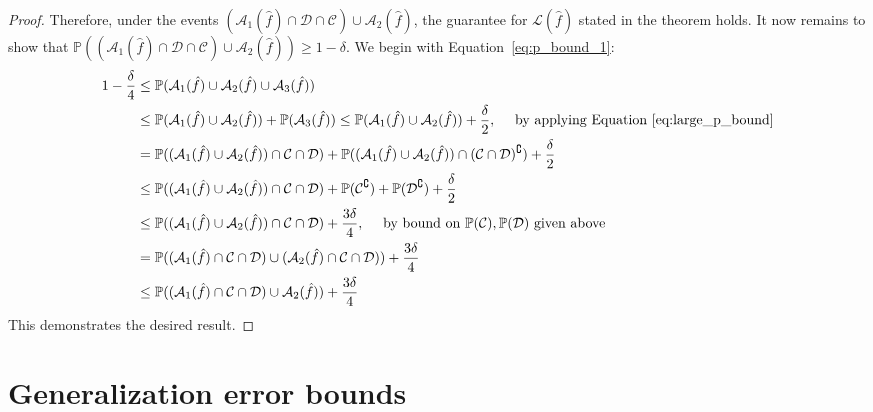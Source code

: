 \begin{proof}
Therefore, under the events $(\mathcal{A}_1(\hat{f})\cap\mathcal{D}\cap\mathcal{C})\cup\mathcal{A}_2(\hat{f})$, the guarantee for $\mathcal{L}(\hat{f})$ stated in the theorem holds. It now remains to show that $\mathbb{P}\left((\mathcal{A}_1(\hat{f})\cap\mathcal{D}\cap\mathcal{C})\cup\mathcal{A}_2(\hat{f})\right) \geq 1-\delta$. We begin with Equation~\eqref{eq:p_bound_1}:
\begin{align}
    1-\frac{\delta}{4} &\leq \mathbb{P}(\mathcal{A}_1(\hat{f})\cup\mathcal{A}_2(\hat{f})\cup\mathcal{A}_3(\hat{f})) \nonumber \\
    &\leq \mathbb{P}(\mathcal{A}_1(\hat{f})\cup\mathcal{A}_2(\hat{f})) + \mathbb{P}(\mathcal{A}_3(\hat{f})) \leq \mathbb{P}(\mathcal{A}_1(\hat{f})\cup\mathcal{A}_2(\hat{f})) + \frac{\delta}{2}, \quad \text{ by applying Equation~\eqref{eq:large_p_bound}}\nonumber \\
    &= \mathbb{P}((\mathcal{A}_1(\hat{f})\cup\mathcal{A}_2(\hat{f}))\cap \mathcal{C}\cap\mathcal{D}) + \mathbb{P}((\mathcal{A}_1(\hat{f})\cup\mathcal{A}_2(\hat{f}))\cap (\mathcal{C}\cap\mathcal{D})^{\complement}) + \frac{\delta}{2} \nonumber \\
    &\leq \mathbb{P}((\mathcal{A}_1(\hat{f})\cup\mathcal{A}_2(\hat{f}))\cap \mathcal{C}\cap\mathcal{D}) + \mathbb{P}(\mathcal{C}^{\complement}) + \mathbb{P}(\mathcal{D}^{\complement}) + \frac{\delta}{2} \nonumber \\
    &\leq \mathbb{P}((\mathcal{A}_1(\hat{f})\cup\mathcal{A}_2(\hat{f}))\cap \mathcal{C}\cap\mathcal{D}) + \frac{3\delta}{4},\quad\text{ by bound on }\mathbb{P}(\mathcal{C}),\mathbb{P}(\mathcal{D})\text{ given above} \nonumber \\
    &=  \mathbb{P}((\mathcal{A}_1(\hat{f})\cap\mathcal{C}\cap\mathcal{D})\cup(\mathcal{A}_2(\hat{f})\cap \mathcal{C}\cap\mathcal{D}))  + \frac{3\delta}{4} \nonumber \\
    &\leq \mathbb{P}((\mathcal{A}_1(\hat{f})\cap\mathcal{C}\cap\mathcal{D})\cup \mathcal{A}_2(\hat{f})) + \frac{3\delta}{4}
\end{align}
This demonstrates the desired result.
\end{proof}

\section{Generalization error bounds}
\label{appendix:generalization_error_bounds}

